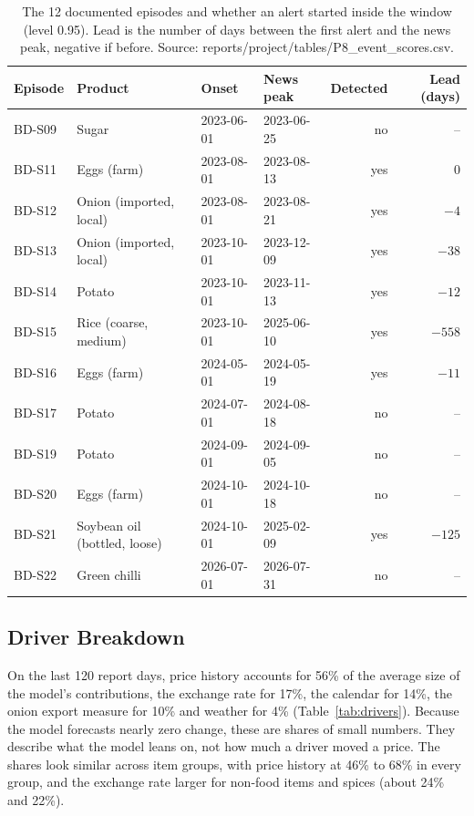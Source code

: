 \documentclass[12pt]{report}
\begin{document}
\begin{table}[H]\centering\small
\caption{The 12 documented episodes and whether an alert started inside the window (level 0.95). Lead is the number of days between the first alert and the news peak, negative if before. Source: reports/project/tables/P8\_event\_scores.csv.}\label{tab:events}
\begin{tabular}{|l|l|l|l|r|r|}
\hline
\textbf{Episode} & \textbf{Product} & \textbf{Onset} & \textbf{News peak} & \textbf{Detected} & \textbf{Lead (days)} \\
\hline
BD-S09 & Sugar & 2023-06-01 & 2023-06-25 & no & -- \\
\hline
BD-S11 & Eggs (farm) & 2023-08-01 & 2023-08-13 & yes & 0 \\
\hline
BD-S12 & Onion (imported, local) & 2023-08-01 & 2023-08-21 & yes & $-4$ \\
\hline
BD-S13 & Onion (imported, local) & 2023-10-01 & 2023-12-09 & yes & $-38$ \\
\hline
BD-S14 & Potato & 2023-10-01 & 2023-11-13 & yes & $-12$ \\
\hline
BD-S15 & Rice (coarse, medium) & 2023-10-01 & 2025-06-10 & yes & $-558$ \\
\hline
BD-S16 & Eggs (farm) & 2024-05-01 & 2024-05-19 & yes & $-11$ \\
\hline
BD-S17 & Potato & 2024-07-01 & 2024-08-18 & no & -- \\
\hline
BD-S19 & Potato & 2024-09-01 & 2024-09-05 & no & -- \\
\hline
BD-S20 & Eggs (farm) & 2024-10-01 & 2024-10-18 & no & -- \\
\hline
BD-S21 & Soybean oil (bottled, loose) & 2024-10-01 & 2025-02-09 & yes & $-125$ \\
\hline
BD-S22 & Green chilli & 2026-07-01 & 2026-07-31 & no & -- \\
\hline
\end{tabular}
\end{table}

\subsection{Driver Breakdown}
On the last 120 report days, price history accounts for 56\% of the average size of the model's contributions, the exchange rate for 17\%, the calendar for 14\%, the onion export measure for 10\% and weather for 4\% (Table~\ref{tab:drivers}). Because the model forecasts nearly zero change, these are shares of small numbers. They describe what the model leans on, not how much a driver moved a price. The shares look similar across item groups, with price history at 46\% to 68\% in every group, and the exchange rate larger for non-food items and spices (about 24\% and 22\%).
\end{document}
